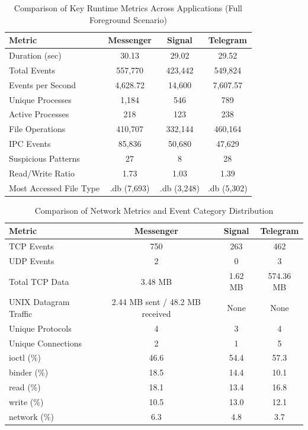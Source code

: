 \documentclass[a4paper,12pt]{report}
\begin{document}
\begin{table}[H]
    \centering
    \caption{Comparison of Key Runtime Metrics Across Applications (Full Foreground Scenario)}
    \label{tab:comparison_key_metrics}
    \begin{tabular}{|l|c|c|c|}
        \hline
        \textbf{Metric} & \textbf{Messenger} & \textbf{Signal} & \textbf{Telegram} \\
        \hline
        Duration (sec) & 30.13 & 29.02 & 29.52 \\
        Total Events & 557,770 & 423,442 & 549,824 \\
        Events per Second & 4,628.72 & 14,600 & 7,607.57 \\
        Unique Processes & 1,184 & 546 & 789 \\
        Active Processes & 218 & 123 & 238 \\
        File Operations & 410,707 & 332,144 & 460,164 \\
        IPC Events & 85,836 & 50,680 & 47,629 \\
        Suspicious Patterns & 27 & 8 & 28 \\
        Read/Write Ratio & 1.73 & 1.03 & 1.39 \\
        Most Accessed File Type & .db (7,693) & .db (3,248) & .db (5,302) \\
        \hline
    \end{tabular}
\end{table}

\begin{table}[H]
    \centering
    \caption{Comparison of Network Metrics and Event Category Distribution}
    \label{tab:comparison_network_categories}
    \begin{tabular}{|l|c|c|c|}
        \hline
        \textbf{Metric} & \textbf{Messenger} & \textbf{Signal} & \textbf{Telegram} \\
        \hline
        TCP Events & 750 & 263 & 462 \\
        UDP Events & 2 & 0 & 3 \\
        Total TCP Data & 3.48 MB & 1.62 MB & 574.36 MB \\
        UNIX Datagram Traffic & 2.44 MB sent / 48.2 MB received & None & None \\
        Unique Protocols & 4 & 3 & 4 \\
        Unique Connections & 2 & 1 & 5 \\
        \hline
        ioctl (\%) & 46.6 & 54.4 & 57.3 \\
        binder (\%) & 18.5 & 14.4 & 10.1 \\
        read (\%) & 18.1 & 13.4 & 16.8 \\
        write (\%) & 10.5 & 13.0 & 12.1 \\
        network (\%) & 6.3 & 4.8 & 3.7 \\
        \hline
    \end{tabular}
\end{table}
\end{document}
